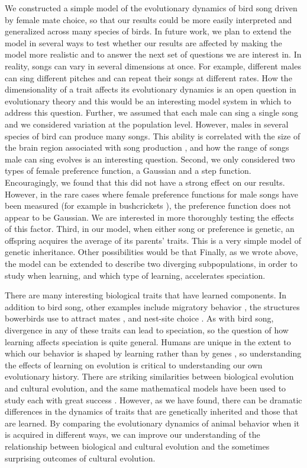 \documentclass[12pt]{article}
\begin{document}
We constructed a simple model of the evolutionary dynamics of bird song driven by female mate choice, so that our results could be more easily interpreted and generalized across many species of birds. In future work, we plan to extend the model in several ways to test whether our results are affected by making the model more realistic and to answer the next set of questions we are interest in. In reality, songs can vary in several dimensions at once. For example, different males can sing different pitches and can repeat their songs at different rates. How the dimensionality of a trait affects its evolutionary dynamics is an open question in evolutionary theory and this would be an interesting model system in which to address this question. Further, we assumed that each male can sing a single song and we considered variation at the population level. However, males in several species of bird can produce many songs. This ability is correlated with the size of the brain region associated with song production \cite{Airey:2000dq}, and how the range of songs male can sing evolves is an interesting question. Second, we only considered two types of female preference function, a Gaussian and a step function. Encouragingly, we found that this did not have a strong effect on our results. However, in the rare cases where female preference functions for male songs have been measured (for example in bushcrickets \cite{Ritchie:1996ys}), the preference function does not appear to be Gaussian. We are interested in more thoroughly testing the effects of this factor. Third, in our model, when either song or preference is genetic, an offspring acquires the average of its parents' traits. This is a very simple model of genetic inheritance. Other possibilities would be that Finally, as we wrote above, the model can be extended to describe two diverging subpopulations, in order to study when learning, and which type of learning, accelerates speciation. 
 

There are many interesting biological traits that have learned components. In addition to bird song, other examples include migratory behavior \cite{Mueller:2013bh}, the structures bowerbirds use to attract mates \cite{Madden:2008ij}, and nest-site choice \cite{Seppanen:2007zr}. As with bird song, divergence in any of these traits can lead to speciation, so the question of how learning affects speciation is quite general. Humans are unique in the extent to which our behavior is shaped by learning rather than by genes \cite{Laland:2010fu}, so understanding the effects of learning on evolution is critical to understanding our own evolutionary history. There are striking similarities between biological evolution and cultural evolution, and the same mathematical models have been used to study each with great success \cite{Mesoudi:2006fk}. However, as we have found, there can be dramatic differences in the dynamics of traits that are genetically inherited and those that are learned. By comparing the evolutionary dynamics of animal behavior when it is acquired in different ways, we can improve our understanding of the relationship between biological and cultural evolution and the sometimes surprising outcomes of cultural evolution.
\end{document}
